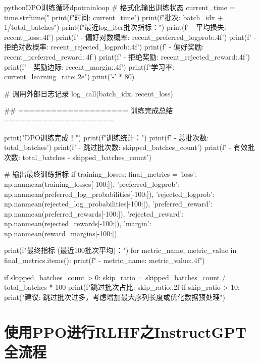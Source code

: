 \documentclass[lang=cn,newtx,10pt,scheme=chinese]{elegantbook}
\begin{document}
\begin{codebox}{python}{DPO训练循环}{dpotrainloop}
        # 格式化输出训练状态
        current_time = time.strftime("%
        print(f"时间: {current_time}")
        print(f"批次: {batch_idx + 1}/{total_batches}")
        print(f"最近{log_iter}批次指标：")
        print(f'   - 平均损失: {recent_loss:.4f}')
        print(f'   - 偏好对数概率: {recent_preferred_logprob:.4f}')
        print(f'   - 拒绝对数概率: {recent_rejected_logprob:.4f}')
        print(f'   - 偏好奖励: {recent_preferred_reward:.4f}')
        print(f'   - 拒绝奖励: {recent_rejected_reward:.4f}')
        print(f'   - 奖励边际: {recent_margin:.4f}')
        print(f"学习率: {current_learning_rate:.2e}")
        print('-' * 80)
        
        # 调用外部日志记录
        log_call(batch_idx, recent_loss)

## ==================== 训练完成总结 ====================

print("DPO训练完成！")
print(f"训练统计：")
print(f'   - 总批次数: {total_batches}')
print(f'   - 跳过批次数: {skipped_batches_count}')
print(f'   - 有效批次数: {total_batches - skipped_batches_count}')

# 输出最终训练指标
if training_losses:
    final_metrics = {
        'loss': np.nanmean(training_losses[-100:]),
        'preferred_logprob': np.nanmean(preferred_log_probabilities[-100:]),
        'rejected_logprob': np.nanmean(rejected_log_probabilities[-100:]),
        'preferred_reward': np.nanmean(preferred_rewards[-100:]),
        'rejected_reward': np.nanmean(rejected_rewards[-100:]),
        'margin': np.nanmean(reward_margins[-100:])
    }
    
    print(f"最终指标 (最近100批次平均)：")
    for metric_name, metric_value in final_metrics.items():
        print(f"   - {metric_name}: {metric_value:.4f}")

if skipped_batches_count > 0:
    skip_ratio = skipped_batches_count / total_batches * 100
    print(f"跳过批次占比: {skip_ratio:.2f}%
    if skip_ratio > 10:
        print("建议: 跳过批次过多，考虑增加最大序列长度或优化数据预处理")
\end{codebox}

\chapter{使用PPO进行RLHF之InstructGPT全流程}
\end{document}
